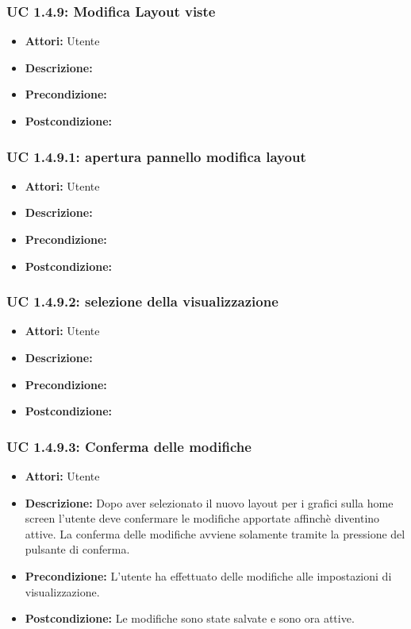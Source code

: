 \subsubsection{UC 1.4.9: Modifica Layout viste }

\begin{itemize}
\item \textbf{Attori:} Utente
\item \textbf{Descrizione:} 
\item \textbf{Precondizione:} 
\item \textbf{Postcondizione:} 
\end{itemize}

\subsubsection{UC 1.4.9.1: apertura pannello modifica layout}

\begin{itemize}
\item \textbf{Attori:} Utente
\item \textbf{Descrizione:} 
\item \textbf{Precondizione:} 
\item \textbf{Postcondizione:} 
\end{itemize}

\subsubsection{UC 1.4.9.2: selezione della visualizzazione}

\begin{itemize}
\item \textbf{Attori:} Utente
\item \textbf{Descrizione:} 
\item \textbf{Precondizione:} 
\item \textbf{Postcondizione:} 
\end{itemize}

\subsubsection{UC 1.4.9.3: Conferma delle modifiche}

\begin{itemize}
\item \textbf{Attori:} Utente
\item \textbf{Descrizione:} Dopo aver selezionato il nuovo layout per i grafici sulla home screen l'utente deve confermare le modifiche apportate affinchè diventino attive. La conferma delle modifiche avviene solamente tramite la pressione del pulsante di conferma.
\item \textbf{Precondizione:} L'utente ha effettuato delle modifiche alle impostazioni di visualizzazione.
\item \textbf{Postcondizione:} Le modifiche sono state salvate e sono ora attive.
\end{itemize}


